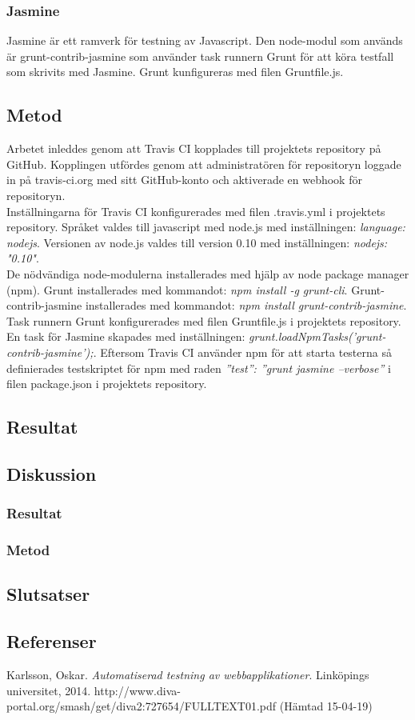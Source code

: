 \subsubsection{Jasmine}
Jasmine är ett ramverk för testning av Javascript. 
Den node-modul som används är grunt-contrib-jasmine som använder task runnern Grunt 
för att köra testfall som skrivits med Jasmine.
Grunt kunfigureras med filen Gruntfile.js.

\subsection{Metod}
Arbetet inleddes genom att Travis CI kopplades till projektets repository på GitHub. Kopplingen utfördes
genom att administratören för repositoryn loggade in på travis-ci.org med sitt GitHub-konto och aktiverade
en webhook för repositoryn.\\

Inställningarna för Travis CI konfigurerades med filen .travis.yml i projektets repository. Språket valdes till
javascript med node.js med inställningen: \emph{language: node\textunderscore js}. Versionen av node.js valdes till version 0.10
med inställningen: \emph{node\textunderscore js: "0.10"}.\\

De nödvändiga node-modulerna installerades med hjälp av node package manager (npm). Grunt installerades
med kommandot: \emph{npm install -g grunt-cli}. Grunt-contrib-jasmine installerades med kommandot: 
\emph{npm install grunt-contrib-jasmine}.\\

Task runnern Grunt konfigurerades med filen Gruntfile.js i projektets repository. En task för Jasmine skapades med
inställningen: \emph{grunt.loadNpmTasks('grunt-contrib-jasmine');}. Eftersom Travis CI använder npm för att starta 
testerna så definierades testskriptet för npm med raden \emph{''test'': ''grunt jasmine --verbose''} i filen package.json 
i projektets repository.

\subsection{Resultat}
\subsection{Diskussion}
\subsubsection{Resultat}
\subsubsection{Metod}
\subsection{Slutsatser}
\subsection{Referenser}
Karlsson, Oskar. \textit{Automatiserad testning av webbapplikationer}. Linköpings universitet, 2014.
http://www.diva-portal.org/smash/get/diva2:727654/FULLTEXT01.pdf (Hämtad 15-04-19)
